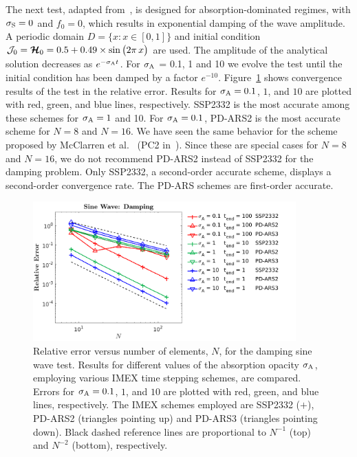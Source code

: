 The next test, adapted from~\cite{skinnerOstriker_2013}, is designed for absorption-dominated regimes, with $\sigma_{{\rm S}} = 0$ and $f_0 = 0$, which results in exponential damping of the wave amplitude.
A periodic domain $D=\{x:x\in[0,1]\}$ and initial condition $\mathcal{J}_{0} = \boldsymbol{\mathcal{H}}_{0} = 0.5+0.49\times\sin\big(2\pi\,x\big)$ are used.
The amplitude of the analytical solution decreases as $e^{-\sigma_{{\rm A}} t}$.
For $\sigma_{{\rm A}}$ = 0.1, 1 and 10 we evolve the test until the initial condition has been damped by a factor $e^{-10}$. 
Figure~\ref{fig:SineWaveDamping} shows convergence results of the test in the relative error.
Results for $\sigma_{{\rm A}}=0.1$, $1$, and $10$ are plotted with red, green, and blue lines, respectively.
SSP2332 is the most accurate among these schemes for $\sigma_{{\rm A}}= 1$ and 10. 
For $\sigma_{{\rm A}}=0.1$, PD-ARS2 is the most accurate scheme for $N=8$ and $N=16$. 
We have seen the same behavior for the scheme proposed by McClarren et al.~\cite{mcclarren_etal_2008} (PC2 in~\cite{chu_etal_2018}).
Since these are special cases for $N=8$ and $N=16$, we do not recommend PD-ARS2 instead of SSP2332 for the damping problem.
Only SSP2332, a second-order accurate scheme, displays a second-order convergence rate.  
The PD-ARS schemes are first-order accurate.

\begin{figure}[h]
  \centering
    \includegraphics[width=0.9\textwidth]{figures/SineWaveDamping}
   \caption{Relative error versus number of elements, $N$, for the damping sine wave test. Results for different values of the absorption opacity $\sigma_{{\rm A}}$, employing various IMEX time stepping schemes, are compared.  Errors for $\sigma_{{\rm A}}=0.1$, $1$, and $10$ are plotted with red, green, and blue lines, respectively.  The IMEX schemes employed are SSP2332 ($+$), PD-ARS2 (triangles pointing up) and PD-ARS3 (triangles pointing down).  Black dashed reference lines are proportional to $N^{-1}$ (top) and $N^{-2}$ (bottom), respectively.}
  \label{fig:SineWaveDamping}
\end{figure}

